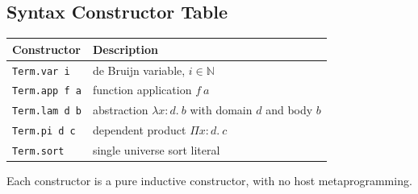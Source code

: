 \subsection{Syntax Constructor Table}\label{subsec:reconstruction-syntax-table}

\begin{tabular}{l l}
\hline
Constructor & Description \\
\hline
\verb|Term.var i| & de Bruijn variable, $i \in \mathbb{N}$ \\
\verb|Term.app f a| & function application $f\ a$ \\
\verb|Term.lam d b| & abstraction $\lambda x:d.\ b$ with domain $d$ and body $b$ \\
\verb|Term.pi d c| & dependent product $\Pi x:d.\ c$ \\
\verb|Term.sort| & single universe sort literal \\
\hline
\end{tabular}

Each constructor is a pure inductive constructor, with no host
metaprogramming.
